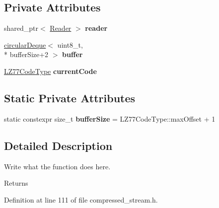 \subsection*{Private Attributes}
\begin{DoxyCompactItemize}
\item 
\hypertarget{classExpandReader_abb317fa1dae74a6f01efb916dc1f1a78}{shared\+\_\+ptr$<$ \hyperlink{classReader}{Reader} $>$ {\bfseries reader}}\label{classExpandReader_abb317fa1dae74a6f01efb916dc1f1a78}

\item 
\hypertarget{classExpandReader_a75ba7c441e5d85a84432604ddbdaa734}{\hyperlink{classcircularDeque}{circular\+Deque}$<$ uint8\+\_\+t, \\*
buffer\+Size+2 $>$ {\bfseries buffer}}\label{classExpandReader_a75ba7c441e5d85a84432604ddbdaa734}

\item 
\hypertarget{classExpandReader_a3829efc17d18ef7a90c05177cea0a402}{\hyperlink{structLZ77CodeType}{L\+Z77\+Code\+Type} {\bfseries current\+Code}}\label{classExpandReader_a3829efc17d18ef7a90c05177cea0a402}

\end{DoxyCompactItemize}
\subsection*{Static Private Attributes}
\begin{DoxyCompactItemize}
\item 
\hypertarget{classExpandReader_aea9fc5ac4ca868bf23dbe48022f81d53}{static constexpr size\+\_\+t {\bfseries buffer\+Size} = L\+Z77\+Code\+Type\+::max\+Offset + 1}\label{classExpandReader_aea9fc5ac4ca868bf23dbe48022f81d53}

\end{DoxyCompactItemize}


\subsection{Detailed Description}
Write what the function does here. 

\begin{DoxyReturn}{Returns}

\end{DoxyReturn}


Definition at line 111 of file compressed\+\_\+stream.\+h.



